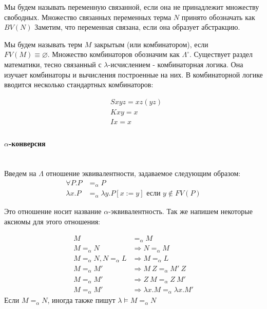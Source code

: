 \documentclass[lambda.tex]{subfiles}
\begin{document}
Мы будем называть переменную связанной, если она не принадлежит множеству свободных. Множество связанных переменных терма $N$ принято обозначать как $BV(N)$ Заметим, что переменная связана, если она образует абстракцию.

Мы будем называть терм $M$ закрытым (или комбинатором), если\\ \(FV(M) \equiv \varnothing\). Множество комбинаторов обозначим как $\Lambda^\circ$. Существует раздел математики, тесно связанный с $\lambda$-исчислением - комбинаторная логика. Она изучает комбинаторы и вычисления построенные на них. В комбинаторной логике вводится несколько стандартных комбинаторов:

\begin{align*}
	&Sxyz = xz(yz)\\
	&Kxy = x\\
    &Ix = x\\
\end{align*}


\paragraph{$\alpha$-конверсия} %
~\\
\label{par:aplha conversion}
Введем на $\Lambda$ отношение эквивалентности, задаваемое следующим образом:
\begin{align*}
\forall P.P &=_\alpha P\\
\lambda x.P &=_\alpha \lambda y.P[x:=y] \text{ если } y \not\in FV(P)
\end{align*}

Это отношение носит название $\alpha$-эквивалентность. Так же напишем некоторые аксиомы для этого отношения:

\begin{align*}
M &=_\alpha M\\
M =_\alpha N &\Rightarrow N =_\alpha M\\
M =_\alpha N, N =_\alpha L &\Rightarrow M =_\alpha L\\
M =_\alpha M' &\Rightarrow M\ Z =_\alpha M'\ Z\\
M =_\alpha M' &\Rightarrow Z\ M =_\alpha Z\ M'\\
M =_\alpha M' &\Rightarrow \lambda x.M =_\alpha \lambda x.M'
\end{align*}
Если $M =_\alpha N$, иногда также пишут $\lambda\models M =_\alpha N$
\end{document}
